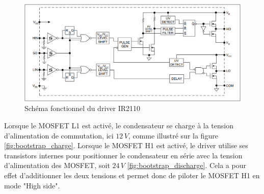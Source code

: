 \documentclass{article}
\begin{document}
    \begin{figure}[H]
    \centering
    \includegraphics[width=0.5\linewidth]{Images/shema_fonctinel_ir2110.png}
    \caption{Schéma fonctionnel du driver IR2110
    }
    \label{fig:schema_ir2110}
\end{figure}
\noindent
Lorsque le MOSFET L1 est activé, le condensateur se charge à la tension d'alimentation de commutation, ici $12\,V$, comme illustré sur la figure \ref{fig:bootstrap_charge}. Lorsque le MOSFET H1 est activé, le driver utilise ses transistors internes pour positionner le condensateur en série avec la tension d'alimentation des MOSFET, soit $24\,V$ \ref{fig:bootstrap_discharge}. Cela a pour effet d'additionner les deux tensions et permet donc de piloter le MOSFET H1 en mode "High side".
\end{document}
